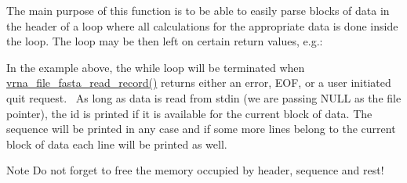 The main purpose of this function is to be able to easily parse blocks of data in the header of a loop where all calculations for the appropriate data is done inside the loop. The loop may be then left on certain return values, e.\+g.\+: 
\begin{DoxyCode}{0}
\DoxyCodeLine{  \textcolor{keywordflow}{if}(\textcolor{keywordtype}{id})}
\DoxyCodeLine{    \}}
\DoxyCodeLine{\}}
\end{DoxyCode}
 In the example above, the while loop will be terminated when \mbox{\hyperlink{group__file__formats_ga8cfb7e271efc9e1f34640acb85475639}{vrna\+\_\+file\+\_\+fasta\+\_\+read\+\_\+record()}} returns either an error, E\+OF, or a user initiated quit request.~\newline
 As long as data is read from stdin (we are passing N\+U\+LL as the file pointer), the id is printed if it is available for the current block of data. The sequence will be printed in any case and if some more lines belong to the current block of data each line will be printed as well.

\begin{DoxyNote}{Note}
Do not forget to free the memory occupied by header, sequence and rest!
\end{DoxyNote}

